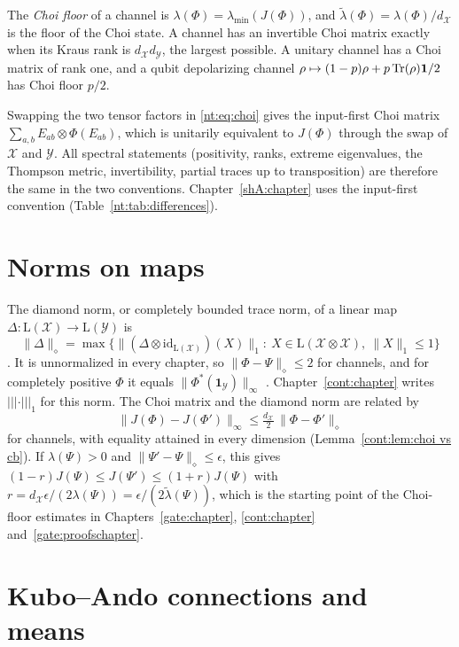 The \emph{Choi floor} of a channel is $\lambda(\Phi)=\lambda_{\min}(J(\Phi))$, and $\tilde\lambda(\Phi)=\lambda(\Phi)/d_{\mathcal X}$ is the floor of the Choi state. A channel has an invertible Choi matrix exactly when its Kraus rank is $d_{\mathcal X}d_{\mathcal Y}$, the largest possible. A unitary channel has a Choi matrix of rank one, and a qubit depolarizing channel $\rho\mapsto(1-p)\rho+p\operatorname{Tr}(\rho)\mathbf 1/2$ has Choi floor $p/2$.

Swapping the two tensor factors in \eqref{nt:eq:choi} gives the input-first Choi matrix $\sum_{a,b}E_{ab}\otimes\Phi(E_{ab})$, which is unitarily equivalent to $J(\Phi)$ through the swap of $\mathcal X$ and $\mathcal Y$. All spectral statements (positivity, ranks, extreme eigenvalues, the Thompson metric, invertibility, partial traces up to transposition) are therefore the same in the two conventions. Chapter~\ref{shA:chapter} uses the input-first convention (Table~\ref{nt:tab:differences}).

\section{Norms on maps}\label{nt:sec:norms}

The diamond norm, or completely bounded trace norm, of a linear map $\Delta:\mathrm L(\mathcal X)\to\mathrm L(\mathcal Y)$ is
\[
\|\Delta\|_\diamond=\max\big\{\|(\Delta\otimes\mathrm{id}_{\mathrm L(\mathcal X)})(X)\|_1:\ X\in\mathrm L(\mathcal X\otimes\mathcal X),\ \|X\|_1\le1\big\}
\]
\cite{Kitaev1997,watrous2018theory}. It is unnormalized in every chapter, so $\|\Phi-\Psi\|_\diamond\le2$ for channels, and for completely positive $\Phi$ it equals $\|\Phi^*(\mathbf 1_{\mathcal Y})\|_\infty$ \cite{Paulsen2003}. Chapter~\ref{cont:chapter} writes $|||\cdot|||_1$ for this norm. The Choi matrix and the diamond norm are related by
\[
\|J(\Phi)-J(\Phi')\|_\infty\le\tfrac{d_{\mathcal X}}2\,\|\Phi-\Phi'\|_\diamond
\]
for channels, with equality attained in every dimension (Lemma~\ref{cont:lem:choi vs cb}). If $\lambda(\Psi)>0$ and $\|\Psi'-\Psi\|_\diamond\le\epsilon$, this gives $(1-r)J(\Psi)\le J(\Psi')\le(1+r)J(\Psi)$ with $r=d_{\mathcal X}\epsilon/(2\lambda(\Psi))=\epsilon/(2\tilde\lambda(\Psi))$, which is the starting point of the Choi-floor estimates in Chapters~\ref{gate:chapter}, \ref{cont:chapter} and~\ref{gate:proofschapter}.

\section{Kubo--Ando connections and means}\label{nt:sec:means}

